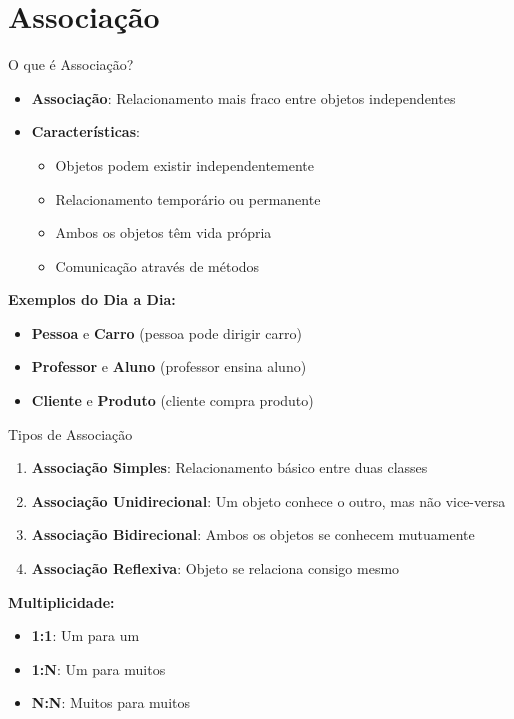 \documentclass[aspectratio=169]{beamer}
\begin{document}
\section{Associação}

\begin{frame}{O que é Associação?}
\begin{itemize}
\item \textbf{Associação}: Relacionamento mais fraco entre objetos independentes
\item \textbf{Características}:
\begin{itemize}
\item Objetos podem existir independentemente
\item Relacionamento temporário ou permanente
\item Ambos os objetos têm vida própria
\item Comunicação através de métodos
\end{itemize}
\end{itemize}

\vspace{0.3cm}
\textbf{Exemplos do Dia a Dia:}
\begin{itemize}
\item \textbf{Pessoa} e \textbf{Carro} (pessoa pode dirigir carro)
\item \textbf{Professor} e \textbf{Aluno} (professor ensina aluno)
\item \textbf{Cliente} e \textbf{Produto} (cliente compra produto)
\end{itemize}
\end{frame}

\begin{frame}{Tipos de Associação}
\begin{enumerate}
\item \textbf{Associação Simples}: Relacionamento básico entre duas classes
\item \textbf{Associação Unidirecional}: Um objeto conhece o outro, mas não vice-versa
\item \textbf{Associação Bidirecional}: Ambos os objetos se conhecem mutuamente
\item \textbf{Associação Reflexiva}: Objeto se relaciona consigo mesmo
\end{enumerate}

\vspace{0.5cm}
\textbf{Multiplicidade:}
\begin{itemize}
\item \textbf{1:1}: Um para um
\item \textbf{1:N}: Um para muitos
\item \textbf{N:N}: Muitos para muitos
\end{itemize}
\end{frame}
\end{document}
